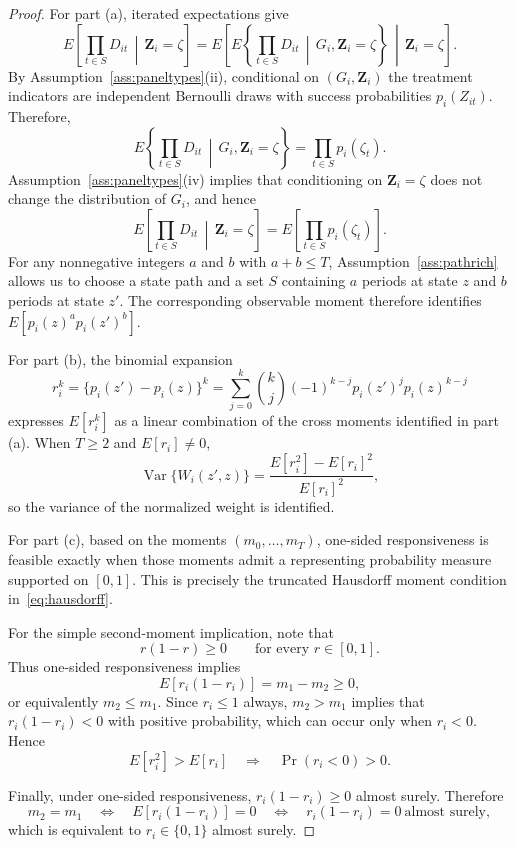 \documentclass[11pt]{article}
\DeclareMathOperator{\Var}{Var}
\newcommand{\1}{\mathbf{1}}
\begin{document}
\begin{proof}
For part (a), iterated expectations give
\[
E\left[
\prod_{t\in S}D_{it}
\,\middle|\,
\mathbf{Z}_i=\zeta
\right]
=
E\left[
E\left\{
\prod_{t\in S}D_{it}
\,\middle|\,
G_i,\mathbf{Z}_i=\zeta
\right\}
\,\middle|\,
\mathbf{Z}_i=\zeta
\right].
\]
By Assumption~\ref{ass:paneltypes}(ii), conditional on
$(G_i,\mathbf{Z}_i)$ the treatment indicators are independent Bernoulli
draws with success probabilities $p_i(Z_{it})$. Therefore,
\[
E\left\{
\prod_{t\in S}D_{it}
\,\middle|\,
G_i,\mathbf{Z}_i=\zeta
\right\}
=
\prod_{t\in S}p_i(\zeta_t).
\]
Assumption~\ref{ass:paneltypes}(iv) implies that conditioning on
$\mathbf{Z}_i=\zeta$ does not change the distribution of $G_i$, and hence
\[
E\left[
\prod_{t\in S}D_{it}
\,\middle|\,
\mathbf{Z}_i=\zeta
\right]
=
E\left[
\prod_{t\in S}p_i(\zeta_t)
\right].
\]
For any nonnegative integers $a$ and $b$ with $a+b\leq T$,
Assumption~\ref{ass:pathrich} allows us to choose a state path and a set
$S$ containing $a$ periods at state $z$ and $b$ periods at state $z'$.
The corresponding observable moment therefore identifies
$E[p_i(z)^a p_i(z')^b]$.

For part (b), the binomial expansion
\[
r_i^k
=
\{p_i(z')-p_i(z)\}^k
=
\sum_{j=0}^k
\binom{k}{j}
(-1)^{k-j}
p_i(z')^j p_i(z)^{k-j}
\]
expresses $E[r_i^k]$ as a linear combination of the cross moments
identified in part (a). When $T\geq2$ and $E[r_i]\neq0$,
\[
\Var\{W_i(z',z)\}
=
\frac{E[r_i^2]-E[r_i]^2}{E[r_i]^2},
\]
so the variance of the normalized weight is identified.

For part (c), based on the moments $(m_0,\ldots,m_T)$, one-sided
responsiveness is feasible exactly when those moments admit a representing
probability measure supported on $[0,1]$. This is precisely the truncated
Hausdorff moment condition in~\eqref{eq:hausdorff}.

For the simple second-moment implication, note that
\[
r(1-r)\geq0
\qquad\text{for every }r\in[0,1].
\]
Thus one-sided responsiveness implies
\[
E[r_i(1-r_i)]
=
m_1-m_2
\geq0,
\]
or equivalently $m_2\leq m_1$. Since $r_i\leq1$ always,
$m_2>m_1$ implies that $r_i(1-r_i)<0$ with positive probability, which
can occur only when $r_i<0$. Hence
\[
E[r_i^2]>E[r_i]
\quad\Longrightarrow\quad
\Pr(r_i<0)>0.
\]

Finally, under one-sided responsiveness,
$r_i(1-r_i)\geq0$ almost surely. Therefore
\[
m_2=m_1
\quad\Longleftrightarrow\quad
E[r_i(1-r_i)]=0
\quad\Longleftrightarrow\quad
r_i(1-r_i)=0\ \text{almost surely},
\]
which is equivalent to $r_i\in\{0,1\}$ almost surely.
\end{proof}
\end{document}
